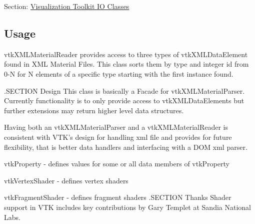 Section\-: \hyperlink{sec_vtkio}{Visualization Toolkit I\-O Classes} \hypertarget{vtkwidgets_vtkxyplotwidget_Usage}{}\subsection{Usage}\label{vtkwidgets_vtkxyplotwidget_Usage}
vtk\-X\-M\-L\-Material\-Reader provides access to three types of vtk\-X\-M\-L\-Data\-Element found in X\-M\-L Material Files. This class sorts them by type and integer id from 0-\/\-N for N elements of a specific type starting with the first instance found.

.S\-E\-C\-T\-I\-O\-N Design This class is basically a Facade for vtk\-X\-M\-L\-Material\-Parser. Currently functionality is to only provide access to vtk\-X\-M\-L\-Data\-Elements but further extensions may return higher level data structures.

Having both an vtk\-X\-M\-L\-Material\-Parser and a vtk\-X\-M\-L\-Material\-Reader is consistent with V\-T\-K's design for handling xml file and provides for future flexibility, that is better data handlers and interfacing with a D\-O\-M xml parser.

vtk\-Property -\/ defines values for some or all data members of vtk\-Property

vtk\-Vertex\-Shader -\/ defines vertex shaders

vtk\-Fragment\-Shader -\/ defines fragment shaders .S\-E\-C\-T\-I\-O\-N Thanks Shader support in V\-T\-K includes key contributions by Gary Templet at Sandia National Labs.

